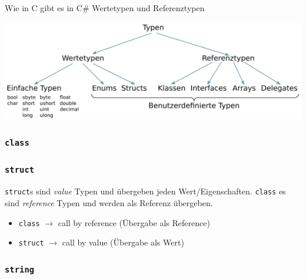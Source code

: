 \documentclass[
  9pt,
  a4paperpaper,
  DIV=11]{scrartcl}
\providecommand{\tightlist}{%
  \setlength{\itemsep}{0pt}\setlength{\parskip}{0pt}}\usepackage{longtable,booktabs,array}
\numberwithin{equation}{section}
\begin{document}
\begin{multicols}{2}
Wie in C gibt es in C\# Wertetypen und Referenztypen

\includegraphics{images/Types.png}

\hypertarget{class}{%
\subsubsection{\texorpdfstring{\texttt{class}}{class}}\label{class}}

\hypertarget{struct}{%
\subsubsection{\texorpdfstring{\texttt{struct}}{struct}}\label{struct}}

\begin{tcolorbox}[enhanced jigsaw, colback=white, toptitle=1mm, coltitle=black, left=2mm, opacityback=0, leftrule=.75mm, colbacktitle=quarto-callout-tip-color!10!white, title=\textcolor{quarto-callout-tip-color}{\faLightbulb}\hspace{0.5em}{Unterschied \texttt{struct} \& \texttt{class}}, breakable, bottomrule=.15mm, bottomtitle=1mm, titlerule=0mm, toprule=.15mm, rightrule=.15mm, colframe=quarto-callout-tip-color-frame, arc=.35mm, opacitybacktitle=0.6]

\texttt{struct}s sind \emph{value} Typen und übergeben jeden
Wert/Eigenschaften. \texttt{class} es sind \emph{reference} Typen und
werden als Referenz übergeben.

\begin{itemize}
\tightlist
\item
  \texttt{class} \(\rightarrow\) call by reference (Übergabe als
  Reference)
\item
  \texttt{struct} \(\rightarrow\) call by value (Übergabe als Wert)
\end{itemize}

\end{tcolorbox}

\hypertarget{string}{%
\subsubsection{\texorpdfstring{\texttt{string}}{string}}\label{string}}


\end{multicols}
\end{document}
